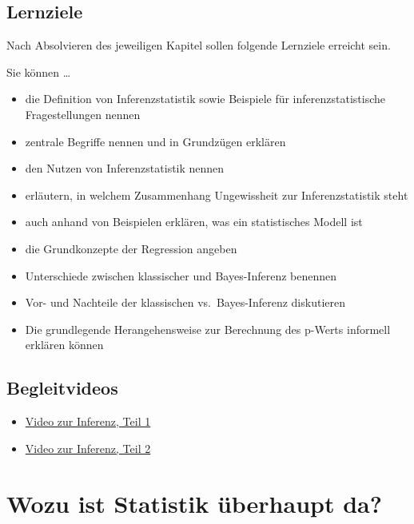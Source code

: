 \documentclass[
  a4paper,
  DIV=11]{scrreprt}
\providecommand{\tightlist}{%
  \setlength{\itemsep}{0pt}\setlength{\parskip}{0pt}}\usepackage{longtable,booktabs,array}
\theoremstyle{definition}
\theoremstyle{remark}
\begin{document}
\hypertarget{lernziele-1}{%
\subsection{Lernziele}\label{lernziele-1}}

Nach Absolvieren des jeweiligen Kapitel sollen folgende Lernziele
erreicht sein.

Sie können \ldots{}

\begin{itemize}
\tightlist
\item
  die Definition von Inferenzstatistik sowie Beispiele für
  inferenzstatistische Fragestellungen nennen
\item
  zentrale Begriffe nennen und in Grundzügen erklären
\item
  den Nutzen von Inferenzstatistik nennen
\item
  erläutern, in welchem Zusammenhang Ungewissheit zur Inferenzstatistik
  steht
\item
  auch anhand von Beispielen erklären, was ein statistisches Modell ist
\item
  die Grundkonzepte der Regression angeben
\item
  Unterschiede zwischen klassischer und Bayes-Inferenz benennen
\item
  Vor- und Nachteile der klassischen vs.~Bayes-Inferenz diskutieren
\item
  Die grundlegende Herangehensweise zur Berechnung des p-Werts informell
  erklären können
\end{itemize}

\hypertarget{begleitvideos}{%
\subsection{Begleitvideos}\label{begleitvideos}}

\begin{itemize}
\tightlist
\item
  \href{https://youtu.be/gcwWwBy0kPI}{Video zur Inferenz, Teil 1}
\item
  \href{https://https://youtu.be/QNMVi6IqQ90}{Video zur Inferenz, Teil
  2}
\end{itemize}

\hypertarget{wozu-ist-statistik-uxfcberhaupt-da}{%
\section{Wozu ist Statistik überhaupt
da?}\label{wozu-ist-statistik-uxfcberhaupt-da}}
\end{document}
